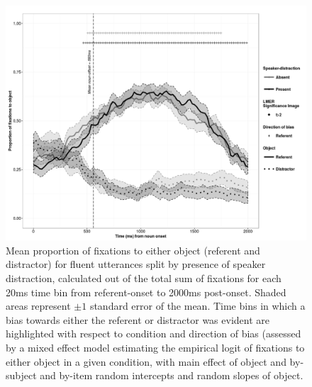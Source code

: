 \documentclass[man]{apa6}
\begin{document}
\begin{figure}
  \centering
	\includegraphics[scale=.5]{fluent.png}
  \caption{Mean proportion of fixations to either object (referent and distractor) for fluent utterances split by presence of speaker distraction, calculated out of the total sum of fixations for each 20ms time bin from referent-onset to 2000ms post-onset. Shaded areas represent $\pm 1$ standard error of the mean. Time bins in which a bias towards either the referent or distractor was evident are highlighted with respect to condition and direction of bias (assessed by a mixed effect model estimating the empirical logit of fixations to either object in a given condition, with main effect of object and by-subject and by-item random intercepts and random slopes of object.}
  \label{fig:flueye}
\end{figure}
\end{document}
